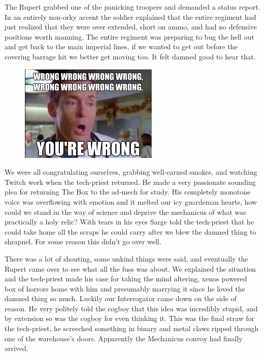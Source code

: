 The Rupert grabbed one of the panicking troopers and demanded a status report. 
In an entirely non-orky accent the soldier explained that the entire regiment had just realized that they were over extended, short on ammo, and had no defensive positions worth manning. 
The entire regiment was preparing to bug the hell out and get back to the main imperial lines, if we wanted to get out before the covering barrage hit we better get moving too. 
It felt damned good to hear that.

\begin{figure}
	\begin{center}
		\includegraphics[width=\figwidth]{pics/4/29.png}
	\end{center}
\end{figure}
We were all congratulating ourselves, grabbing well-earned smokes, and watching Twitch work when the tech-priest returned. 
He made a very passionate sounding plea for returning The Box to the ad-mech for study. 
His completely monotone voice was overflowing with emotion and it melted our icy guardsman hearts, how could we stand in the way of science and deprive the mechanicus of what was practically a holy relic? 
With tears in his eyes Sarge told the tech-priest that he could take home all the scraps he could carry after we blew the damned thing to shrapnel. 
For some reason this didn't go over well.

There was a lot of shouting, some unkind things were said, and eventually the Rupert came over to see what all the fuss was about. 
We explained the situation and the tech-priest made his case for taking the mind altering, xenos powered box of horrors home with him and presumably marrying it since he loved the damned thing so much. 
Luckily our Interrogator came down on the side of reason. 
He very politely told the cogboy that this idea was incredibly stupid, and by extension so was the cogboy for even thinking it. 
This was the final straw for the tech-priest, he screeched something in binary and metal claws ripped through one of the warehouse's doors. 
Apparently the Mechanicus convoy had finally arrived.

